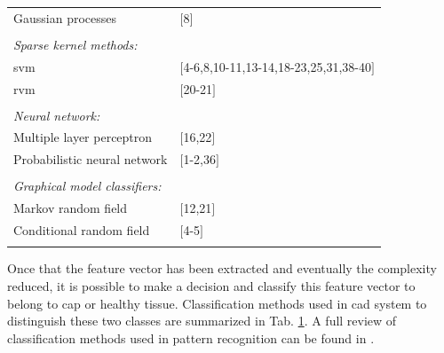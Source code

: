 \begin{table}
\begin{tabular}{p{.60\linewidth} p{.30\linewidth}}
		\quad Gaussian processes & $[$8$]$ \\ \\ [-1.5ex]
		\textit{Sparse kernel methods:} & \\
		\quad \acs{svm} & $[$4-6,8,10-11,13-14,18-23,25,31,38-40$]$ \\
		\quad \acs{rvm} & $[$20-21$]$ \\ \\ [-1.5ex]
		\textit{Neural network:} & \\ 
		\quad Multiple layer perceptron & $[$16,22$]$ \\
		\quad Probabilistic neural network & $[$1-2,36$]$ \\ \\ [-1.5ex]
		\textit{Graphical model classifiers:} & \\
		\quad Markov random field & $[$12,21$]$ \\
		\quad Conditional random field & $[$4-5$]$ \\ \\ [-1.5ex]
		\hline
	\end{tabular}
	\label{tab:class}
\end{table}

Once that the feature vector has been extracted and eventually the complexity reduced, it is possible to make a decision and classify this feature vector to belong to \ac{cap} or healthy tissue. Classification methods used in \ac{cad} system to distinguish these two classes are summarized in Tab. \ref{tab:class}. A full review of classification methods used in pattern recognition can be found in \cite{Bishop2006}.

